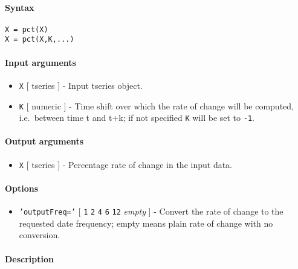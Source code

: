 


	\paragraph{Syntax}

\begin{verbatim}
X = pct(X)
X = pct(X,K,...)
\end{verbatim}

\paragraph{Input arguments}

\begin{itemize}
\item
  \texttt{X} {[} tseries {]} - Input tseries object.
\item
  \texttt{K} {[} numeric {]} - Time shift over which the rate of change
  will be computed, i.e.~between time t and t+k; if not specified
  \texttt{K} will be set to \texttt{-1}.
\end{itemize}

\paragraph{Output arguments}

\begin{itemize}
\itemsep1pt\parskip0pt
\item
  \texttt{X} {[} tseries {]} - Percentage rate of change in the input
  data.
\end{itemize}

\paragraph{Options}

\begin{itemize}
\itemsep1pt\parskip0pt
\item
  \texttt{'outputFreq='} {[} \texttt{1} \textbar{} \texttt{2} \textbar{}
  \texttt{4} \textbar{} \texttt{6} \textbar{} \texttt{12} \textbar{}
  \emph{empty} {]} - Convert the rate of change to the requested date
  frequency; empty means plain rate of change with no conversion.
\end{itemize}

\paragraph{Description}

